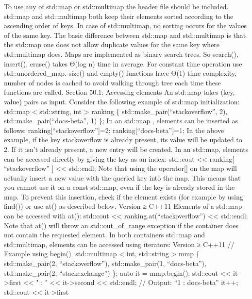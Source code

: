 To use any of std::map or std::multimap the header ﬁle should be
included. std::map and std::multimap both keep their elements sorted
according to the ascending order of keys. In case of std::multimap, no
sorting occurs for the values of the same key. The basic diﬀerence
between std::map and std::multimap is that the std::map one does not
allow duplicate values for the same key where std::multimap does. Maps
are implemented as binary search trees. So search(), insert(), erase()
takes Θ(log n) time in average. For constant time operation use
std::unordered\_map. size() and empty() functions have Θ(1) time
complexity, number of nodes is cached to avoid walking through tree each
time these functions are called. Section 50.1: Accessing elements An
std::map takes (key, value) pairs as input. Consider the following
example of std::map initialization: std::map \textless{} std::string,
int \textgreater{} ranking \{ std::make\_pair(``stackoverflow'', 2),
std::make\_pair(``docs-beta'', 1) \}; In an std::map , elements can be
inserted as follows: ranking{[}``stackoverflow''{]}=2;
ranking{[}``docs-beta''{]}=1; In the above example, if the key
stackoverflow is already present, its value will be updated to 2. If it
isn't already present, a new entry will be created. In an std::map,
elements can be accessed directly by giving the key as an index:
std::cout \textless\textless{} ranking{[} ``stackoverflow'' {]}
\textless\textless{} std::endl; Note that using the operator{[}{]} on
the map will actually insert a new value with the queried key into the
map. This means that you cannot use it on a const std::map, even if the
key is already stored in the map. To prevent this insertion, check if
the element exists (for example by using find()) or use at() as
described below. Version ≥ C++11 Elements of a std::map can be accessed
with at(): std::cout \textless\textless{} ranking.at(``stackoverflow'')
\textless\textless{} std::endl; Note that at() will throw an
std::out\_of\_range exception if the container does not contain the
requested element. In both containers std::map and std::multimap,
elements can be accessed using iterators: Version ≥ C++11 // Example
using begin() std::multimap \textless{} int, std::string \textgreater{}
mmp \{ std::make\_pair(2, ``stackoverflow''), std::make\_pair(1,
``docs-beta''), std::make\_pair(2, ``stackexchange'') \}; auto it =
mmp.begin(); std::cout \textless\textless{} it-\textgreater first
\textless\textless{} " : " \textless\textless{} it-\textgreater second
\textless\textless{} std::endl; // Output: ``1 : docs-beta'' it++;
std::cout \textless\textless{} it-\textgreater first

